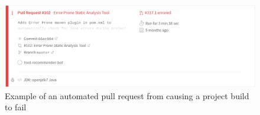 







\begin{figure}
\centering
	\includegraphics[width=\textwidth]{images/error.png}
	\caption{Example of an automated pull request from \tool causing a project build to fail}	
	\label{fig:error} 
\end{figure}


